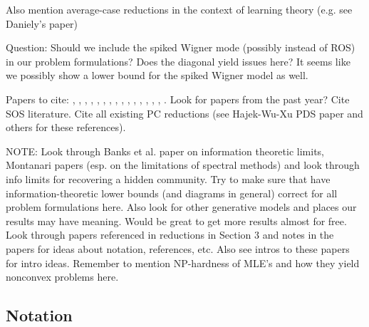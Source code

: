 \documentclass[11pt]{article}
\begin{document}
Also mention average-case reductions in the context of learning theory (e.g. see Daniely's paper)

Question: Should we include the spiked Wigner mode (possibly instead of ROS) in our problem formulations? Does the diagonal yield issues here? It seems like we possibly show a lower bound for the spiked Wigner model as well.

Papers to cite: \cite{hopkins2015tensor}, \cite{montanari2015limitation}, \cite{gao2015minimax}, \cite{bubeck2016testing}, \cite{dharmawansa2014joint}, \cite{ma2015volume}, \cite{perry2016optimality}, \cite{chen2016statistical}, \cite{flammarion2016optimal}, \cite{arias2016distribution}, \cite{d2007direct}, \cite{alon1998finding}, \cite{addario2010combinatorial}, \cite{arias2015detecting}, \cite{d2008optimal}, \cite{el2010information}. Look for papers from the past year? Cite SOS literature. Cite all existing PC reductions (see Hajek-Wu-Xu PDS paper and others for these references).

\cite{shalev2012using,berthet2013complexity,zhang2014lower,hardt2014computational,ma2015computational,hajek2015computational,ma2015sum,wang2016average,wang2016statistical,cai2015computational,chen2016statistical}

\cite{montanari2015limitation}

NOTE: Look through Banks et al. paper on information theoretic limits, Montanari papers (esp. on the limitations of spectral methods) and look through info limits for recovering a hidden community. Try to make sure that have information-theoretic lower bounds (and diagrams in general) correct for all problem formulations here. Also look for other generative models and places our results may have meaning. Would be great to get more results almost for free. Look through papers referenced in reductions in Section 3 and notes in the papers for ideas about notation, references, etc. Also see intros to these papers for intro ideas. Remember to mention NP-hardness of MLE's and how they yield nonconvex problems here.

\subsection{Notation}
\end{document}
